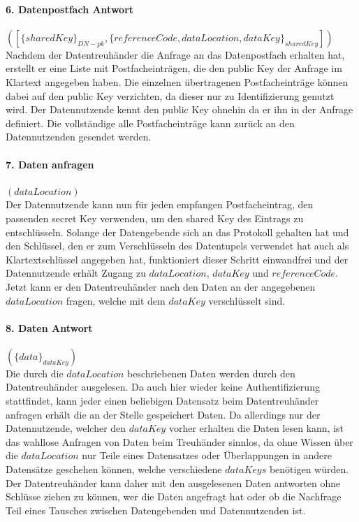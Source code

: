 \documentclass[11pt,a4paper]{scrreprt}
\begin{document}
\paragraph{6. Datenpostfach Antwort} $([\{sharedKey\}_{DN-pk}, \{referenceCode, dataLocation, dataKey\}_{sharedKey}])$\\
Nachdem der Datentreuhänder die Anfrage an das Datenpostfach erhalten hat, erstellt er eine Liste mit Postfacheinträgen, die den public Key der Anfrage im Klartext angegeben haben. Die einzelnen übertragenen Postfacheinträge können dabei auf den public Key verzichten, da dieser nur zu Identifizierung genutzt wird. Der Datennutzende kennt den public Key ohnehin da er ihn in der Anfrage definiert. Die vollständige alle Postfacheinträge kann zurück an den Datennutzenden gesendet werden.

\paragraph{7. Daten anfragen} $(dataLocation)$\\
Der Datennutzende kann nun für jeden empfangen Postfacheintrag, den passenden secret Key verwenden, um den shared Key des Eintrags zu entschlüsseln. Solange der Datengebende sich an das Protokoll gehalten hat und den Schlüssel, den er zum Verschlüsseln des Datentupels verwendet hat auch als Klartextschlüssel angegeben hat, funktioniert dieser Schritt einwandfrei und der Datennutzende erhält Zugang zu $dataLocation$, $dataKey$ und $referenceCode$. Jetzt kann er den Datentreuhänder nach den Daten an der angegebenen $dataLocation$ fragen, welche mit dem $dataKey$ verschlüsselt sind.

\paragraph{8. Daten Antwort} $(\{data\}_{dataKey})$\\
Die durch die $dataLocation$ beschriebenen Daten werden durch den Datentreuhänder ausgelesen. Da auch hier wieder keine Authentifizierung stattfindet, kann jeder einen beliebigen Datensatz beim Datentreuhänder anfragen erhält die an der Stelle gespeichert Daten. Da allerdings nur der Datennutzende, welcher den $dataKey$ vorher erhalten die Daten lesen kann, ist das wahllose Anfragen von Daten beim Treuhänder sinnlos, da ohne Wissen über die $dataLocation$ nur Teile eines Datensatzes oder Überlappungen in andere Datensätze geschehen können, welche verschiedene $dataKeys$ benötigen würden. Der Datentreuhänder kann daher mit den ausgelesenen Daten antworten ohne Schlüsse ziehen zu können, wer die Daten angefragt hat oder ob die Nachfrage Teil eines Tausches zwischen Datengebenden und Datennutzenden ist.
\end{document}
